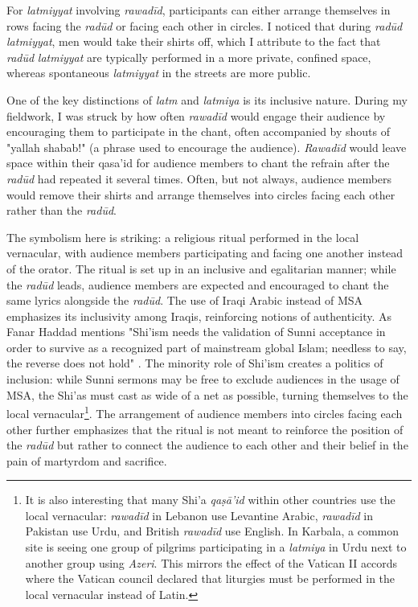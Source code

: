 For \emph{latmiyyat} involving \emph{rawadīd}, participants can either arrange themselves in rows facing the \emph{radūd} or facing each other in circles. I noticed that during \emph{radūd} \emph{latmiyyat}, men would take their shirts off, which I attribute to the fact that \emph{radūd} \emph{latmiyyat} are typically performed in a more private, confined space, whereas spontaneous \emph{latmiyyat} in the streets are more public.

One of the key distinctions of \emph{latm} and \emph{latmiya} is its inclusive nature. During my fieldwork, I was struck by how often \emph{rawadīd} would engage their audience by encouraging them to participate in the chant, often accompanied by shouts of "yallah shabab!" (a phrase used to encourage the audience). \emph{Rawadīd} would leave space within their qasa'id for audience members to chant the refrain after the \emph{radūd} had repeated it several times. Often, but not always, audience members would remove their shirts and arrange themselves into circles facing each other rather than the \emph{radūd}.

The symbolism here is striking: a religious ritual performed in the local vernacular, with audience members participating and facing one another instead of the orator. The ritual is set up in an inclusive and egalitarian manner; while the \emph{radūd} leads, audience members are expected and encouraged to chant the same lyrics alongside the \emph{radūd}. The use of Iraqi Arabic instead of MSA emphasizes its inclusivity among Iraqis, reinforcing notions of authenticity. As Fanar Haddad mentions "Shi'ism needs the validation of Sunni acceptance in order to survive as a recognized part of mainstream global Islam; needless to say, the reverse does not hold" \cite[179]{haddad_understanding_2020}. The minority role of Shi'ism creates a politics of inclusion: while Sunni sermons may be free to exclude audiences in the usage of MSA, the Shi'as must cast as wide of a net as possible, turning themselves to the local vernacular\footnote{It is also interesting that many Shi'a \emph{qaṣā’id} within other countries use the local vernacular: \emph{rawadīd} in Lebanon use Levantine Arabic, \emph{rawadīd} in Pakistan use Urdu, and British \emph{rawadīd} use English. In Karbala, a common site is seeing one group of pilgrims participating in a \emph{latmiya} in Urdu next to another group using \emph{Azeri}. This mirrors the effect of the Vatican II accords where the Vatican council declared that liturgies must be performed in the local vernacular instead of Latin.}. The arrangement of audience members into circles facing each other further emphasizes that the ritual is not meant to reinforce the position of the \emph{radūd} but rather to connect the audience to each other and their belief in the pain of martyrdom and sacrifice.

